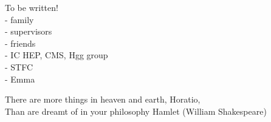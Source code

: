 \begin{acknowledgements}
To be written!\\
- family\\
- supervisors\\
- friends\\
- IC HEP, CMS, Hgg group\\
- STFC\\
- Emma \\
\end{acknowledgements}



\tableofcontents

\renewcommand{\listfigurename}{List of figures}
\renewcommand{\listtablename}{List of tables}

\listoffigures
\listoftables

\frontquote%
{There are more things in heaven and earth, Horatio, \\
Than are dreamt of in your philosophy} 
  {Hamlet (William Shakespeare)}
